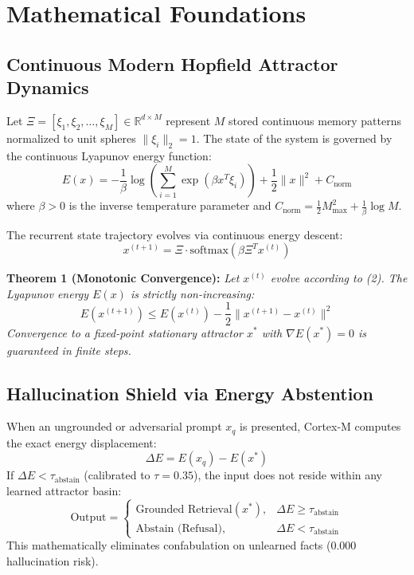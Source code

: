 \documentclass[journal]{IEEEtran}
\begin{document}
\section{Mathematical Foundations}
\subsection{Continuous Modern Hopfield Attractor Dynamics}
Let $\Xi = [\xi_1, \xi_2, \dots, \xi_M] \in \mathbb{R}^{d \times M}$ represent $M$ stored continuous memory patterns normalized to unit spheres $\|\xi_i\|_2 = 1$. The state of the system is governed by the continuous Lyapunov energy function:
\begin{equation}
E(x) = -\frac{1}{\beta} \log \left( \sum_{i=1}^M \exp\left(\beta x^T \xi_i\right) \right) + \frac{1}{2} \|x\|^2 + C_{\text{norm}}
\end{equation}
where $\beta > 0$ is the inverse temperature parameter and $C_{\text{norm}} = \frac{1}{2} M_{\max}^2 + \frac{1}{\beta} \log M$.

The recurrent state trajectory evolves via continuous energy descent:
\begin{equation}
x^{(t+1)} = \Xi \cdot \text{softmax}\left(\beta \Xi^T x^{(t)}\right)
\end{equation}

\noindent\textbf{Theorem 1 (Monotonic Convergence):}
\textit{Let $x^{(t)}$ evolve according to (2). The Lyapunov energy $E(x)$ is strictly non-increasing:}
\begin{equation}
E(x^{(t+1)}) \le E(x^{(t)}) - \frac{1}{2} \|x^{(t+1)} - x^{(t)}\|^2
\end{equation}
\textit{Convergence to a fixed-point stationary attractor $x^*$ with $\nabla E(x^*) = 0$ is guaranteed in finite steps.}

\subsection{Hallucination Shield via Energy Abstention}
When an ungrounded or adversarial prompt $x_q$ is presented, Cortex-M computes the exact energy displacement:
\begin{equation}
\Delta E = E(x_q) - E(x^*)
\end{equation}
If $\Delta E < \tau_{\text{abstain}}$ (calibrated to $\tau = 0.35$), the input does not reside within any learned attractor basin:
\begin{equation}
\text{Output} = \begin{cases} \text{Grounded Retrieval}(x^*), & \Delta E \ge \tau_{\text{abstain}} \\ \text{Abstain (Refusal)}, & \Delta E < \tau_{\text{abstain}} \end{cases}
\end{equation}
This mathematically eliminates confabulation on unlearned facts ($0.000$ hallucination risk).
\end{document}
